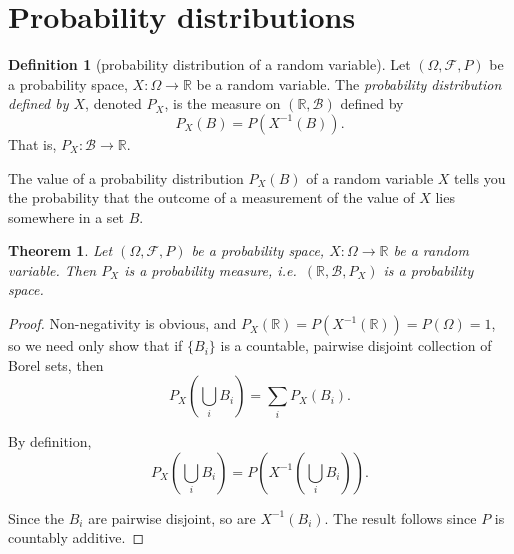 \documentclass[a4paper,12pt]{scrreprt}
\newcommand{\R}{\mathbb{R}}
\theoremstyle{definition}
\newtheorem{definition}{Definition}[section]
\theoremstyle{plain}
\newtheorem{theorem}{Theorem}[section]
\theoremstyle{remark}
\begin{document}
\section{Probability distributions}
\begin{definition}[probability distribution of a random variable]
  \label{def:probabilitydistributionofrandomvariable}
  Let $(\Omega, \mathcal{F}, P)$ be a probability space, $X\colon \Omega \to \R$ be a random variable. The \emph{probability distribution defined by $X$}, denoted $P_{X}$, is the measure on $(\R, \mathcal{B})$ defined by
  \begin{equation*}
    P_{X}(B) = P(X^{-1}(B)).
  \end{equation*}
  That is, $P_{X}\colon \mathcal{B} \to \R$.
\end{definition}

The value of a probability distribution $P_{X}(B)$ of a random variable $X$ tells you the probability that the outcome of a measurement of the value of $X$ lies somewhere in a set $B$.

\begin{theorem}
  Let $(\Omega, \mathcal{F}, P)$ be a probability space, $X\colon \Omega \to \R$ be a random variable. Then $P_{X}$ is a probability measure, i.e.\ $(\R, \mathcal{B}, P_{X})$ is a probability space.
\end{theorem}
\begin{proof}
  Non-negativity is obvious, and $P_{X}(\R) = P(X^{-1}(\R)) = P(\Omega) = 1$, so we need only show that if $\{B_{i}\}$ is a countable, pairwise disjoint collection of Borel sets, then
  \begin{equation*}
    P_{X}\left( \bigcup_{i} B_{i} \right) = \sum_{i} P_{X}(B_{i}).
  \end{equation*}

  By definition,
  \begin{equation*}
    P_{X}\left( \bigcup_{i} B_{i} \right) = P\left( X^{-1}\left( \bigcup_{i} B_{i} \right) \right).
  \end{equation*}

  Since the $B_{i}$ are pairwise disjoint, so are $X^{-1}(B_{i})$. The result follows since $P$ is countably additive.
\end{proof}
\end{document}
